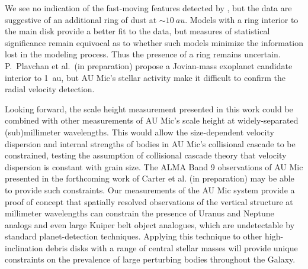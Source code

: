 \documentclass[modern]{aastex62}
\begin{document}
We see no indication of the fast-moving features detected by \cite{boccaletti15}, but the data are suggestive of an additional ring of dust at $\sim \SI{10}{au}$.
Models with a ring interior to the main disk provide a better fit to the data, but measures of statistical significance remain equivocal as to whether such models minimize the information lost in the modeling process.
Thus the presence of a ring remains uncertain. 
P.~Plavchan et al.~(in preparation) propose a Jovian-mass exoplanet candidate interior to \SI{1}{au}, but AU Mic's stellar activity make it difficult to confirm the radial velocity detection.

Looking forward, the scale height measurement presented in this work could be combined with other measurements of AU Mic's scale height at widely-separated (sub)millimeter wavelengths.
This would allow the size-dependent velocity dispersion and internal strengths of bodies in AU Mic's collisional cascade to be constrained, testing the assumption of collisional cascade theory that velocity dispersion is constant with grain size.
The ALMA Band 9 observations of AU Mic presented in the forthcoming work of Carter et al. (in preparation) may be able to provide such constraints.
Our measurements of the AU Mic system provide a proof of concept that spatially resolved observations of the vertical structure at millimeter wavelengths can constrain the presence of Uranus and Neptune analogs and even large Kuiper belt object analogues, which are undetectable by standard planet-detection techniques.  
Applying this technique to other high-inclination debris disks with a range of central stellar masses will provide unique constraints on the prevalence of 
large perturbing bodies
throughout the Galaxy.
\end{document}
